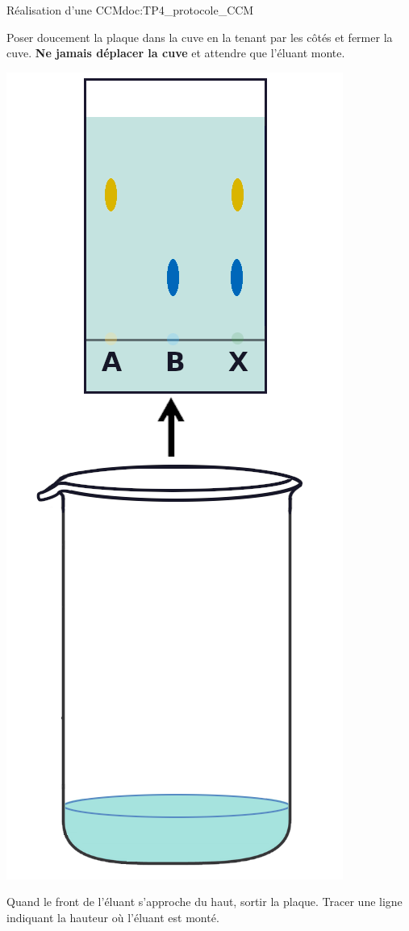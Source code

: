 \begin{doc}{Réalisation d'une CCM}{doc:TP4_protocole_CCM}
\begin{multicols}{2}
\begin{center}
      Poser doucement la plaque dans la cuve en la tenant par les côtés et fermer la cuve.
      \textbf{Ne jamais déplacer la cuve} et attendre que l'éluant monte.
    \end{center}

    \begin{center}
      \includegraphics[height=0.25\textheight]{images/chimie/CCM/CCM_etapes_retrait}
      
      Quand le front de l'éluant s'approche du haut, sortir la plaque.
      Tracer une ligne indiquant la hauteur où l'éluant est monté.
    \end{center}
  \end{multicols}
\end{doc}


